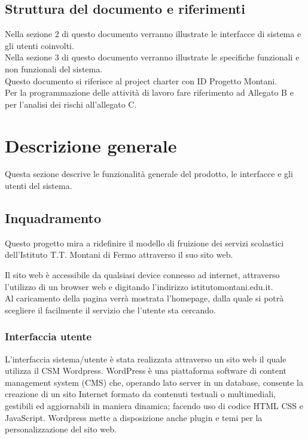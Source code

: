 \documentclass{article}
\begin{document}
	\subsection{\textbf{Struttura del documento e riferimenti}}
	Nella sezione 2 di questo documento verranno illustrate le interfacce di sistema e gli utenti coinvolti.\\
	Nella sezione 3 di questo documento verranno illustrate le specifiche funzionali e non funzionali del sistema.\\
	Questo documento si riferisce al project charter con ID Progetto Montani.\\
	Per la programmazione delle attività di lavoro fare riferimento ad Allegato B e per l'analisi dei rischi all'allegato C.\\
	
	\vspace{1cm}
	
	\section{\textbf{Descrizione generale}}
     Questa sezione descrive le funzionalità generale del prodotto, le interfacce e gli utenti del sistema.

	\subsection{\textbf{Inquadramento}}
	Questo progetto mira a ridefinire il modello di fruizione dei servizi scolastici dell'Istituto T.T. Montani di Fermo attraverso il suo sito web.
	
	Il sito web è accessibile da qualsiasi device connesso ad internet, attraverso l'utilizzo di un browser web e digitando l'indirizzo istitutomontani.edu.it.\\
	Al caricamento della pagina verrà mostrata l'homepage, dalla quale si potrà scegliere il facilmente il servizio che l'utente sta cercando. 
	
	\subsubsection{\textbf{Interfaccia utente}}
	L’interfaccia sistema/utente è stata realizzata attraverso un sito web il quale utilizza il CSM Wordpress. WordPress è una piattaforma software di content management system (CMS) che, operando lato server in un database, consente la creazione di un sito Internet formato da contenuti testuali o multimediali, gestibili ed aggiornabili in maniera dinamica; facendo uso di codice HTML CSS e JavaScript. Wordpress mette a disposizione anche plugin e temi per la personalizzazione del sito web. 
	
\end{document}
